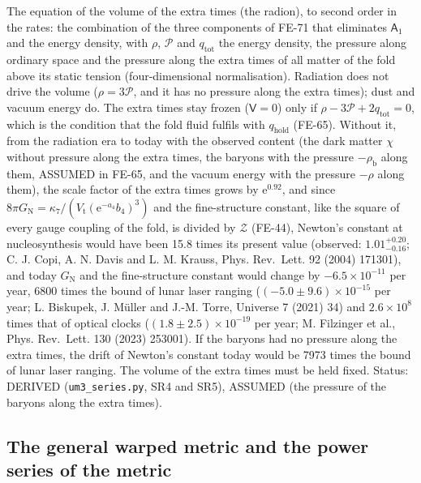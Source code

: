 \documentclass[
  10pt,
]{article}
\begin{document}
The equation of the volume of the extra times (the radion), to second
order in the rates: the combination of the three components of FE-71
that eliminates \(\mathsf{A}_1\) and the energy density, with \(\rho\),
\(\mathcal{P}\) and \(q_{\mathrm{tot}}\) the energy density, the
pressure along ordinary space and the pressure along the extra times of
all matter of the fold above its static tension (four-dimensional
normalisation). Radiation does not drive the volume
(\(\rho = 3\mathcal{P}\), and it has no pressure along the extra times);
dust and vacuum energy do. The extra times stay frozen
(\(\mathsf{V} = 0\)) only if
\(\rho - 3\mathcal{P} + 2q_{\mathrm{tot}} = 0\), which is the condition
that the fold fluid fulfils with \(q_{\mathrm{hold}}\) (FE-65). Without
it, from the radiation era to today with the observed content (the dark
matter \(\chi\) without pressure along the extra times, the baryons with
the pressure \(-\rho_{\mathrm{b}}\) along them, ASSUMED in FE-65, and
the vacuum energy with the pressure \(-\rho\) along them), the scale
factor of the extra times grows by \(\mathrm{e}^{0.92}\), and since
\(8\pi G_{\mathrm{N}} = \kappa_7/(V_{\mathrm{t}}(\mathrm{e}^{-a_4}b_4)^3)\)
and the fine-structure constant, like the square of every gauge coupling
of the fold, is divided by \(\mathcal{Z}\) (FE-44), Newton's constant at
nucleosynthesis would have been 15.8 times its present value (observed:
\(1.01^{+0.20}_{-0.16}\); C. J. Copi, A. N. Davis and L. M. Krauss,
Phys. Rev.~Lett. 92 (2004) 171301), and today \(G_{\mathrm{N}}\) and the
fine-structure constant would change by \(-6.5\times10^{-11}\) per year,
6800 times the bound of lunar laser ranging
(\((-5.0 \pm 9.6)\times10^{-15}\) per year; L. Biskupek, J. Müller and
J.-M. Torre, Universe 7 (2021) 34) and \(2.6\times10^8\) times that of
optical clocks (\((1.8 \pm 2.5)\times10^{-19}\) per year; M. Filzinger
et al., Phys. Rev.~Lett. 130 (2023) 253001). If the baryons had no
pressure along the extra times, the drift of Newton's constant today
would be 7973 times the bound of lunar laser ranging. The volume of the
extra times must be held fixed. Status: DERIVED
(\texttt{um3\_series.py}, SR4 and SR5), ASSUMED (the pressure of the
baryons along the extra times).

\hypertarget{the-general-warped-metric-and-the-power-series-of-the-metric}{%
\subsection{The general warped metric and the power series of the
metric}\label{the-general-warped-metric-and-the-power-series-of-the-metric}}
\end{document}
